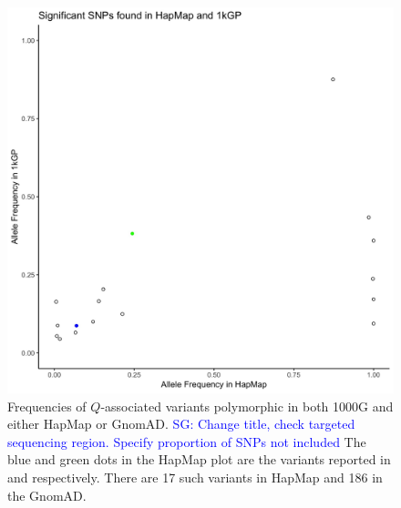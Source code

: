 \documentclass[9pt,lineno]{elife}
\newcommand{\sgcomment}[1]{\textcolor{blue}{SG: #1}}
\begin{document}
\begin{figure}[h]
\includegraphics[width=\hsize,keepaspectratio]{./Figures/Hap.jpg}
\caption{Frequencies of $Q$-associated variants polymorphic in both 1000G and either HapMap or GnomAD. \sgcomment{Change title, check targeted  sequencing region. Specify proportion of SNPs not included} The blue and green dots in the HapMap plot are the variants reported in \citep{Mandage2017} and \citep{Kraja2011} respectively. There are 17 such variants in HapMap and 186 in the GnomAD.}
\label{HapMap_GnomAD}
\end{figure}
\end{document}
